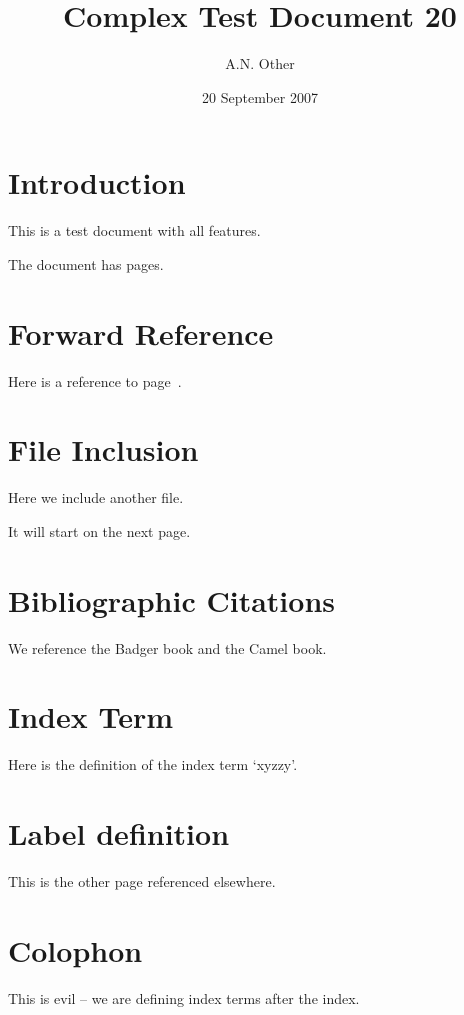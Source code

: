 \documentclass{article}
\date{20 September 2007}
\author{A.N. Other}
\title{Complex Test Document 20}
\begin{document}
\maketitle
\tableofcontents

\pagebreak
\section{Introduction}
This is a test document with all features.

The document has \pageref{LastPage} pages.

\pagebreak
\section{Forward Reference}

Here is a reference to page~\pageref{otherpage}.

\pagebreak
\section{File Inclusion}

Here we include another f{}ile.

It will start on the next page.



\pagebreak
\section{Bibliographic Citations}
We reference the Badger book\cite{wardley-ptt-2003} and the Camel book\cite{wall-perl-2000}.

\pagebreak
\section{Index Term}

Here is the def{}inition of the index term `xyzzy'.


\pagebreak
\section{Label definition}
This is the other page\label{otherpage} referenced elsewhere.


\pagebreak

\pagebreak
\printindex

\section{Colophon}

This is evil -- we are def{}ining index terms after the index.
\end{document}
